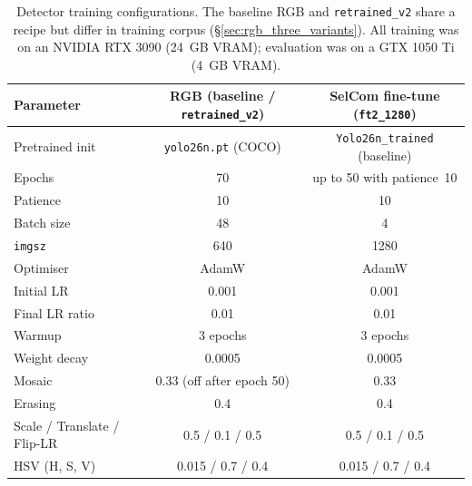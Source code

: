 \documentclass[12pt,a4paper,oneside,openright]{book}
\begin{document}
\begin{table}[htbp]
    \centering
    \caption{Detector training configurations. The baseline RGB and \texttt{retrained\_v2} share a recipe but differ in training corpus (\S\ref{sec:rgb_three_variants}). All training was on an NVIDIA RTX 3090 (24~GB VRAM); evaluation was on a GTX 1050 Ti (4~GB VRAM).}
    \label{tab:training_recipes}
    \begin{tabular}{lcc}
        \toprule
        Parameter & RGB (baseline / \texttt{retrained\_v2}) & SelCom fine-tune (\texttt{ft2\_1280}) \\
        \midrule
        Pretrained init   & \texttt{yolo26n.pt} (COCO) & \texttt{Yolo26n\_trained} (baseline)        \\
        Epochs            & 70                         & up to 50 with patience~10                   \\
        Patience          & 10                         & 10                                          \\
        Batch size        & 48                         & 4                                           \\
        \texttt{imgsz}    & 640                        & 1280                                        \\
        Optimiser         & AdamW                      & AdamW                                       \\
        Initial LR        & 0.001                      & 0.001                                       \\
        Final LR ratio    & 0.01                       & 0.01                                        \\
        Warmup            & 3 epochs                   & 3 epochs                                    \\
        Weight decay      & 0.0005                     & 0.0005                                      \\
        Mosaic            & 0.33 (off after epoch 50)  & 0.33                                        \\
        Erasing           & 0.4                        & 0.4                                         \\
        Scale / Translate / Flip-LR & 0.5 / 0.1 / 0.5  & 0.5 / 0.1 / 0.5                             \\
        HSV (H, S, V)     & 0.015 / 0.7 / 0.4          & 0.015 / 0.7 / 0.4                           \\
        \bottomrule
    \end{tabular}
\end{table}
\end{document}
